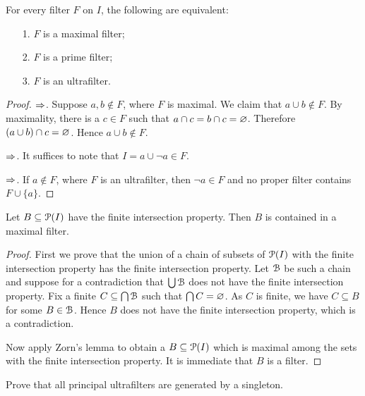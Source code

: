 \documentclass[creche.tex]{subfiles}
\begin{document}
\begin{proposition}
For every filter $F$ on $I$, the following are equivalent:
\begin{itemize}
\item[1.] $F$ is a maximal filter;
\item[2.] $F$ is a prime filter;
\item[3.] $F$ is an ultrafilter.
\end{itemize}
\end{proposition}
\begin{proof}
$\IMP$. Suppose $a,b\notin F$, where $F$ is maximal. We claim that $a\cup b\notin F$. By maximality, there is a $c\in F$ such that $a\cap c= b\cap c= \0$. Therefore $(a\cup b)\cap c= \0$. Hence  $a\cup b\notin F$. 

$\IMP$. It suffices to note that $I=a\cup \neg a\in F$. 

$\IMP$. If $a\notin F$, where $F$ is an ultrafilter, then $\neg a\in F$ and no proper filter contains $F\cup\{a\}$.
\end{proof}

\begin{proposition}\label{esistenzamassimale1}
Let $B\subseteq\P(I)$ have the finite intersection property. Then $B$ is contained in a maximal filter.
\end{proposition}

\begin{proof}
First we prove that the union of a chain of subsets of $\P(I)$ with the finite intersection property has the finite intersection property. Let $\B$ be such a chain and suppose for a contradiction that $\bigcup\B$ does not have the finite intersection property. Fix a finite $C\subseteq\bigcap\B$ such that $\bigcap  C=\0$. As $C$ is finite, we have $C\subseteq B$ for some $B\in\B$. Hence $B$ does not have the finite intersection property, which is a contradiction.


Now apply Zorn's lemma to obtain a $B\subseteq\P(I)$ which is maximal among the sets with the finite intersection property. It is immediate that $B$ is a filter.
\end{proof}

\begin{exercise}
Prove that all principal ultrafilters are generated by a singleton.\QED
\end{exercise}



\end{document}
